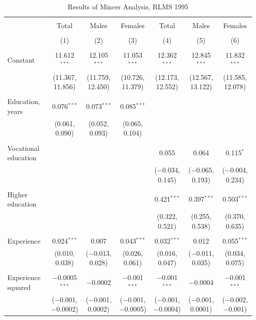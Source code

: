 \documentclass[alpha-refs]{wiley-article-01g}
\begin{document}
\begin{landscape}

\fontsize{9}{11}
\selectfont

\begin{table}[!htbp] \centering 
\renewcommand{\arraystretch}{1.0}
  \caption{Results of Mincer Analysis, RLMS 1995} 
  \label{} 
\begin{tabular}{@{\extracolsep{5pt}}lcccccc} 
\\[-1.8ex]\hline 
\hline \\[-1.8ex] 
 & Total & Males & Females & Total & Males & Females \\ 
\\[-1.8ex] & (1) & (2) & (3) & (4) & (5) & (6)\\ 
\hline \\[-1.8ex] 
 Constant & 11.612$^{***}$ & 12.105$^{***}$ & 11.053$^{***}$ & 12.362$^{***}$ & 12.845$^{***}$ & 11.832$^{***}$ \\ 
  & (11.367, 11.856) & (11.759, 12.450) & (10.726, 11.379) & (12.173, 12.552) & (12.567, 13.122) & (11.585, 12.078) \\ 
  & & & & & & \\ 
 Education, years & 0.076$^{***}$ & 0.073$^{***}$ & 0.085$^{***}$ &  &  &  \\ 
  & (0.061, 0.090) & (0.052, 0.093) & (0.065, 0.104) &  &  &  \\ 
  & & & & & & \\ 
 Vocational education &  &  &  & 0.055 & 0.064 & 0.115$^{*}$ \\ 
  &  &  &  & ($-$0.034, 0.145) & ($-$0.065, 0.193) & ($-$0.004, 0.234) \\ 
  & & & & & & \\ 
 Higher education &  &  &  & 0.421$^{***}$ & 0.397$^{***}$ & 0.503$^{***}$ \\ 
  &  &  &  & (0.322, 0.521) & (0.255, 0.538) & (0.370, 0.635) \\ 
  & & & & & & \\ 
 Experience & 0.024$^{***}$ & 0.007 & 0.043$^{***}$ & 0.032$^{***}$ & 0.012 & 0.055$^{***}$ \\ 
  & (0.010, 0.038) & ($-$0.013, 0.028) & (0.026, 0.061) & (0.016, 0.047) & ($-$0.011, 0.035) & (0.034, 0.075) \\ 
  & & & & & & \\ 
 Experience squared & $-$0.0005$^{***}$ & $-$0.0002 & $-$0.001$^{***}$ & $-$0.001$^{***}$ & $-$0.0004 & $-$0.001$^{***}$ \\ 
  & ($-$0.001, $-$0.0002) & ($-$0.001, 0.0002) & ($-$0.001, $-$0.0005) & ($-$0.001, $-$0.0004) & ($-$0.001, 0.0001) & ($-$0.002, $-$0.001) \\ 

\end{tabular}
\end{table}
\end{landscape}
\end{document}
